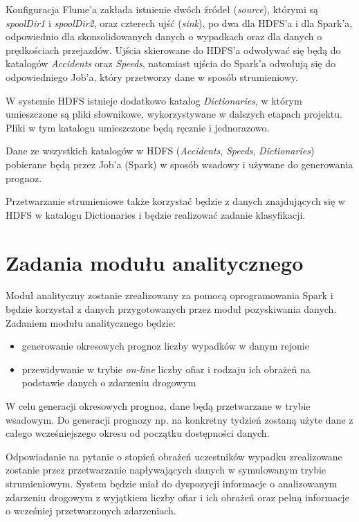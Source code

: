 \documentclass{article}
\begin{document}
Konfiguracja Flume’a zakłada istnienie dwóch źródeł (\textit{source}), którymi są \textit{spoolDir1} i \textit{spoolDir2}, oraz czterech ujść (\textit{sink}), po dwa dla HDFS’a i dla Spark’a, odpowiednio dla skonsolidowanych danych o wypadkach oraz dla danych o prędkościach przejazdów. Ujścia skierowane do HDFS’a odwoływać się będą do katalogów \textit{Accidents} oraz \textit{Speeds}, natomiast ujścia do Spark’a odwołują się do odpowiedniego Job’a, który przetworzy dane w sposób strumieniowy.

W systemie HDFS istnieje dodatkowo katalog \textit{Dictionaries}, w którym umieszczone są pliki słownikowe, wykorzystywane w dalszych etapach projektu. Pliki w tym katalogu umieszczone będą ręcznie i jednorazowo.  

Dane ze wszystkich katalogów w HDFS (\textit{Accidents}, \textit{Speeds}, \textit{Dictionaries}) pobierane będą przez Job’a (Spark) w sposób wsadowy i używane do generowania prognoz.

Przetwarzanie strumieniowe także korzystać będzie z danych znajdujących się w HDFS w katalogu Dictionaries i będzie realizować zadanie klasyfikacji.


\section{Zadania modułu analitycznego}

Moduł analityczny zostanie zrealizowany za pomocą oprogramowania Spark i będzie korzystał z danych przygotowanych przez moduł pozyskiwania danych. Zadaniem modułu analitycznego będzie:
\begin{itemize}
    \item generowanie okresowych prognoz liczby wypadków w danym rejonie
    \item przewidywanie w trybie \emph{on-line} liczby ofiar i rodzaju ich obrażeń na podstawie danych o zdarzeniu drogowym
\end{itemize}

W celu generacji okresowych prognoz, dane będą przetwarzane w trybie wsadowym. Do generacji prognozy np. na konkretny tydzień zostaną użyte dane z całego wcześniejszego okresu od początku dostępności danych.

Odpowiadanie na pytanie o stopień obrażeń uczestników wypadku zrealizowane zostanie przez przetwarzanie napływających danych w symulowanym trybie strumieniowym. System będzie miał do dyspozycji informacje o analizowanym zdarzeniu drogowym z wyjątkiem liczby ofiar i ich obrażeń oraz pełną informacje o wcześniej przetworzonych zdarzeniach.
\end{document}
